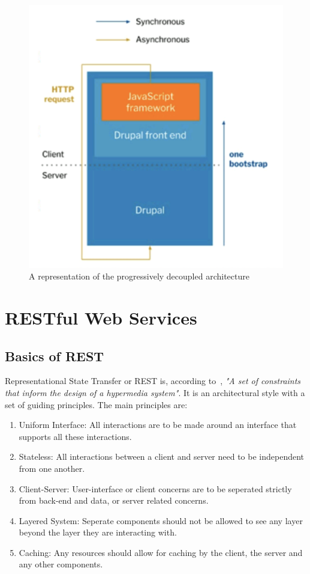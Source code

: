 \begin{figure}
	\centering
	\includegraphics{./img/Progressively_Decoupled.png}
	\caption[Progressively decoupled CMS architecture]{A representation of the progressively decoupled architecture ~\autocite{So2018}}
\end{figure}


\section{RESTful Web Services}


\subsection{Basics of REST}
Representational State Transfer or REST is, according to~\textcite{Wilde2011}, \emph{"A set of constraints that inform the design of a hypermedia system"}. It is an architectural style with a set of guiding principles. The main principles are: 
\begin{enumerate}
	\item Uniform Interface: All interactions are to be made around an interface that supports all these interactions.
	\item  Stateless: All interactions between a client and server need to be independent from one another.
	\item Client-Server: User-interface or client concerns are to be seperated strictly from back-end and data, or server related concerns.
	\item Layered System: Seperate components should not be allowed to see any layer beyond the layer they are interacting with.
	\item Caching: Any resources should allow for caching by the client, the server and any other components.
\end{enumerate}

